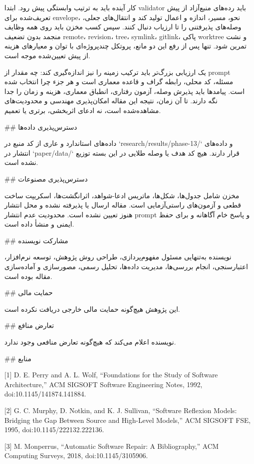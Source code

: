 \documentclass[11pt,a4paper]{article}
\begin{document}
کار آینده باید به ترتیب وابستگی پیش رود. ابتدا validator باید رده‌های منبع‌آزاد از پیش تعریف‌شده برای
envelope، نحو، مسیر، اندازه و اعمال تولید کند و انتقال‌های جعلی، وصله‌های پذیرفتنی را تا ارزیاب دنبال
کنند. سپس کسب مخزن باید روی همه وظایف منجمد بدون تضعیف remote، revision، tree، symlink، gitlink،
پاکی worktree و نشت تمرین شود. تنها پس از رفع این دو مانع، پروتکل چندپروژه‌ای با توان و معیارهای هزینه
از پیش تعیین‌شده موجه است.

یک ارزیابی بزرگ‌تر باید ترکیب زمینه را نیز اندازه‌گیری کند: چه مقدار از prompt مسئله، کد محلی، رابطه
گراف و قاعده معماری است و هر جزء چرا انتخاب شده است. پیامدها باید پذیرش وصله، آزمون رفتاری، انطباق
معماری، هزینه و زمان را جدا نگه دارند. تا آن زمان، نتیجه این مقاله امکان‌پذیری مهندسی و محدودیت‌های
مشاهده‌شده است، نه ادعای اثربخشی، برتری یا تعمیم.

\#\# دسترس‌پذیری داده‌ها

داده‌های استاندارد و عاری از کد منبع در `research/results/phase-13/` و داده‌های انتشار در `paper/data/`
قرار دارند. هیچ کد هدف یا وصله طلایی در این بسته توزیع نشده است.

\#\# دسترس‌پذیری مصنوعات

مخزن شامل جدول‌ها، شکل‌ها، ماتریس ادعا-شواهد، اثرانگشت‌ها، اسکریپت ساخت قطعی و آزمون‌های راستی‌آزمایی
است. مقاله ارسال یا پذیرفته نشده و محل انتشار هنوز تعیین نشده است. محدودیت عدم انتشار prompt و پاسخ
خام آگاهانه و برای حفظ ایمنی و منشأ داده است.

\#\# مشارکت نویسنده

نویسنده به‌تنهایی مسئول مفهوم‌پردازی، طراحی روش پژوهش، توسعه نرم‌افزار، اعتبارسنجی، انجام بررسی‌ها،
مدیریت داده‌ها، تحلیل رسمی، مصورسازی و آماده‌سازی مقاله بوده است.

\#\# حمایت مالی

این پژوهش هیچ‌گونه حمایت مالی خارجی دریافت نکرده است.

\#\# تعارض منافع

نویسنده اعلام می‌کند که هیچ‌گونه تعارض منافعی وجود ندارد.

\#\# منابع

[1] D. E. Perry and A. L. Wolf, “Foundations for the Study of Software Architecture,” ACM SIGSOFT Software Engineering Notes, 1992, doi:10.1145/141874.141884.

[2] G. C. Murphy, D. Notkin, and K. J. Sullivan, “Software Reflexion Models: Bridging the Gap Between Source and High-Level Models,” ACM SIGSOFT FSE, 1995, doi:10.1145/222132.222136.

[3] M. Monperrus, “Automatic Software Repair: A Bibliography,” ACM Computing Surveys, 2018, doi:10.1145/3105906.
\end{document}
